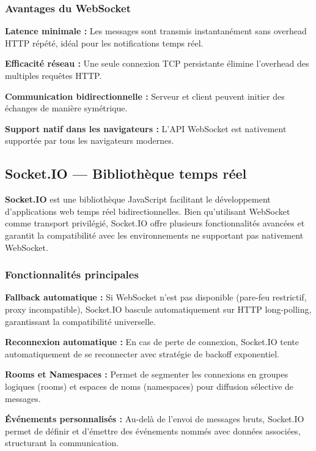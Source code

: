 \subsubsection{Avantages du WebSocket}

\textbf{Latence minimale :} Les messages sont transmis instantanément sans overhead HTTP répété, idéal pour les notifications temps réel.

\textbf{Efficacité réseau :} Une seule connexion TCP persistante élimine l'overhead des multiples requêtes HTTP.

\textbf{Communication bidirectionnelle :} Serveur et client peuvent initier des échanges de manière symétrique.

\textbf{Support natif dans les navigateurs :} L'API WebSocket est nativement supportée par tous les navigateurs modernes.

\subsection{Socket.IO — Bibliothèque temps réel}

\textbf{Socket.IO} est une bibliothèque JavaScript facilitant le développement d'applications web temps réel bidirectionnelles. Bien qu'utilisant WebSocket comme transport privilégié, Socket.IO offre plusieurs fonctionnalités avancées et garantit la compatibilité avec les environnements ne supportant pas nativement WebSocket.

\subsubsection{Fonctionnalités principales}

\textbf{Fallback automatique :} Si WebSocket n'est pas disponible (pare-feu restrictif, proxy incompatible), Socket.IO bascule automatiquement sur HTTP long-polling, garantissant la compatibilité universelle.

\textbf{Reconnexion automatique :} En cas de perte de connexion, Socket.IO tente automatiquement de se reconnecter avec stratégie de backoff exponentiel.

\textbf{Rooms et Namespaces :} Permet de segmenter les connexions en groupes logiques (rooms) et espaces de noms (namespaces) pour diffusion sélective de messages.

\textbf{Événements personnalisés :} Au-delà de l'envoi de messages bruts, Socket.IO permet de définir et d'émettre des événements nommés avec données associées, structurant la communication.

